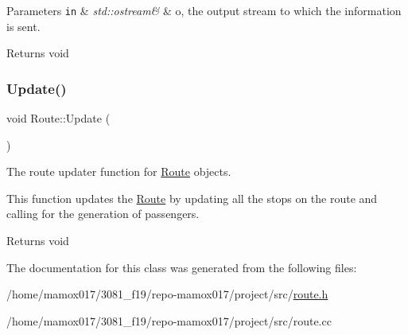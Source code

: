 \begin{DoxyParams}[1]{Parameters}
\mbox{\tt in}  & {\em std\+::ostream\&} & o, the output stream to which the information is sent.\\
\hline
\end{DoxyParams}
\begin{DoxyReturn}{Returns}
void 
\end{DoxyReturn}
\mbox{\label{classRoute_a7ecf1d4200f5fe110de4a1d9ea9408c3}} 
\subsubsection{\texorpdfstring{Update()}{Update()}}
{\footnotesize\ttfamily void Route\+::\+Update (\begin{DoxyParamCaption}{ }\end{DoxyParamCaption})}



The route updater function for \hyperlink{classRoute}{Route} objects. 

This function updates the \hyperlink{classRoute}{Route} by updating all the stops on the route and calling for the generation of passengers.

\begin{DoxyReturn}{Returns}
void 
\end{DoxyReturn}


The documentation for this class was generated from the following files\+:\begin{DoxyCompactItemize}
\item 
/home/mamox017/3081\+\_\+f19/repo-\/mamox017/project/src/\hyperlink{route_8h}{route.\+h}\item 
/home/mamox017/3081\+\_\+f19/repo-\/mamox017/project/src/route.\+cc\end{DoxyCompactItemize}
